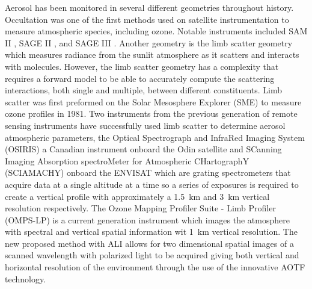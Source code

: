 \documentclass[12pt]{article}
\begin{document}
Aerosol has been monitored in several different geometries throughout history. Occultation was one of the first methods used on satellite instrumentation to measure atmospheric species, including ozone. Notable instruments included SAM II \citep{McCormick1979}, SAGE II \citep{McCormick1987}, and SAGE III \citep{Thomason2003}. Another geometry is the limb scatter geometry which measures radiance from the sunlit atmosphere as it scatters and interacts with molecules. However, the limb scatter geometry has a complexity that requires a forward model to be able to accurately compute the scattering interactions, both single and multiple, between different constituents. Limb scatter was first preformed on the Solar Mesosphere Explorer (SME) \citep{Barth1983} to measure ozone profiles in 1981. Two instruments from the previous generation of remote sensing instruments have successfully used limb scatter to determine aerosol atmospheric parameters, the Optical Spectrograph and InfraRed Imaging System (OSIRIS) a Canadian instrument onboard the Odin satellite \citep{Llewellyn2004} and SCanning Imaging Absorption spectroMeter for Atmospheric CHartographY (SCIAMACHY) onboard the ENVISAT \citep{Bovensmann1999} which are grating spectrometers that acquire data at a single altitude at a time so a series of exposures is required to create a vertical profile with approximately a 1.5~km and 3~km vertical resolution respectively. The Ozone Mapping Profiler Suite - Limb Profiler (OMPS-LP) \cite{Dittman2002} is a current generation instrument which images the atmosphere with spectral and vertical spatial information wit 1~km vertical resolution. The new proposed method with ALI allows for two dimensional spatial images of a scanned wavelength with polarized light to be acquired giving both vertical and horizontal resolution of the environment through the use of the innovative AOTF technology.

\end{document}
